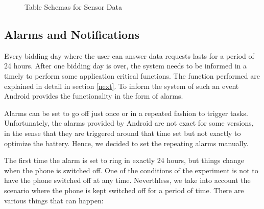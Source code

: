 \begin{figure}[htp]
\hspace{1em}
%
\caption{Table Schemas for Sensor Data}
\label{fig:ts22}
\end{figure}


\subsection{Alarms and Notifications}

Every bidding day where the user can answer data requests lasts for a period of 24 hours. After one bidding day is over, the system needs to be informed in a timely to perform some application critical functions. The function performed are explained in detail in section \ref{next}. 
To inform the system of such an event Android provides the functionality in the form of alarms. 

Alarms can be set to go off just once or in a repeated fashion to trigger tasks. Unfortunately, the alarms provided by Android are not exact for some versions, in the sense that they are triggered around that time set but not exactly to optimize the battery. Hence, we decided to set the repeating alarms manually. 

The first time the alarm is set to ring in exactly 24 hours, but things change when the phone is switched off.
One of the conditions of the experiment is not to have the phone switched off at any time. Neverthless, we take into account the scenario where
the phone is kept switched off for a period of time. There are various things that can happen:

